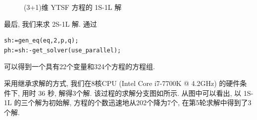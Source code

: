 \begin{figure}[ht]
\centering
{}
\caption{(3+1)维 YTSF 方程的 1S-1L 解} \label{fig-1S1L}
\end{figure}

最后, 我们来求 2S-1L 解. 通过
\begin{verbatim}
sh:=gen_eq(eq,2,p,q);
ph:=sh:-get_solver(use_parallel);
\end{verbatim}
可以得到一个具有22个变量和324个方程的方程组. 

采用继承求解的方式, 我们在8核CPU (Intel Core i7-7700K @ 4.2GHz) 的硬件条件下, 用时 36 秒, 解得3个解. 该过程的求解分支图如所示. 从图中可以看出, 以 1S-1L 的三个解为初始解, 方程的个数迅速地从202个降为7个, 在第5轮求解中得到了3个解. 

